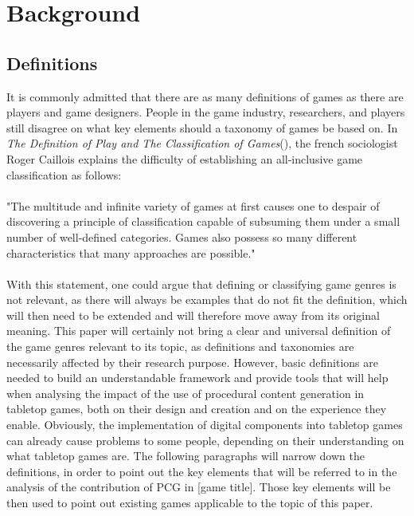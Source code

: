 \section{Background}
\subsection{Definitions}
It is commonly admitted that there are as many definitions of games as there are players and game designers. People in the game industry, researchers, and players still disagree on what key elements should a taxonomy of games be based on. In \textit{The Definition of Play and The Classification of Games}(), the french sociologist Roger Caillois explains the difficulty of establishing an all-inclusive game classification as follows:
\\\\
"The multitude and infinite variety of games at first causes one to despair of discovering a principle of classification capable of subsuming them under a small number of well-defined categories. Games also possess so many different characteristics that many approaches are possible."
\\\\
With this statement, one could argue that defining or classifying game genres is not relevant, as there will always be examples that do not fit the definition, which will then need to be extended and will therefore move away from its original meaning. This paper will certainly not bring a clear and universal definition of the game genres relevant to its topic, as definitions and taxonomies are necessarily affected by their research purpose. However, basic definitions are needed to build an understandable framework and provide tools that will help when analysing the impact of the use of procedural content generation in tabletop games, both on their design and creation and on the experience they enable.
Obviously, the implementation of digital components into tabletop games can already cause problems to some people, depending on their understanding on what tabletop games are. The following paragraphs will narrow down the definitions, in order to point out the key elements that will be referred to in the analysis of the contribution of PCG in [game title]. Those key elements will be then used to point out existing games applicable to the topic of this paper.

